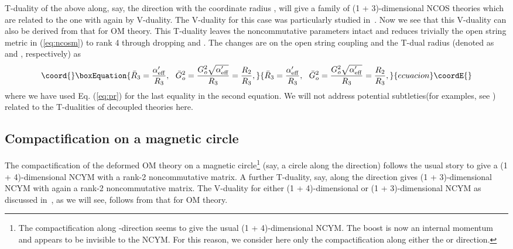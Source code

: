 \documentclass[a4paper,12pt]{article}
\begin{document}
	T-duality of the above along, say, the \coordHE{} direction with the 
coordinate radius \coordHE{}, will give a family of (1 + 3)-dimensional NCOS 
theories which are related to the one with \coordHE{} again by
V-duality. The V-duality for this  case was particularly studied
in~\cite{CW,CLW}.
Now we see that this V-duality can also be derived from that for OM
theory. This T-duality leaves the noncommutative parameters
intact and reduces trivially the open string metric in (\ref{eq:ncosm})
to rank 4 through dropping \coordHE{} and \coordHE{}. The changes
are on the open string coupling and the T-dual radius (denoted as \coordHE{}
and  \coordHE{}, respectively) as
\begin{equation}\coord{}\boxEquation{
\bar R_3 = \frac{\alpha'_{\rm eff}}{R_3}, \ \ \bar G^2_o = \frac{G^2_o 
\sqrt{\alpha'_{\rm eff}}}{R_3} = \frac{R_2}{R_3},
}{
\bar R_3 = \frac{\alpha'_{\rm eff}}{R_3}, \ \ \bar G^2_o = \frac{G^2_o 
\sqrt{\alpha'_{\rm eff}}}{R_3} = \frac{R_2}{R_3},
}{ecuacion}\coordE{}\end{equation}
where we have used Eq. (\ref{eq:pr}) for the last equality in the second
equation. We will not address potential subtleties(for examples, 
see \cite{klem,kawt,dangkone,dangktwo}) related to the
T-dualities of decoupled theories here. 

\subsection{Compactification on a magnetic circle}

	The compactification of the deformed OM theory on a magnetic
circle\footnote{The
compactification along \coordHE{}-direction seems to give the usual 
(1 + 4)-dimensional NCYM. The boost is now an internal momentum and
appears to be invisible to the NCYM. For this reason, we consider here
only the compactification along either the \coordHE{} or \coordHE{} direction.} 
(say, a circle along the \coordHE{} direction) follows the usual story 
to give a (1 + 4)-dimensional NCYM with a rank-2 noncommutative matrix.
A further T-duality, say, along the \coordHE{} direction gives (1 +
3)-dimensional NCYM with again a rank-2 noncommutative matrix. The
V-duality for either (1 + 4)-dimensional or (1 + 3)-dimensional NCYM as 
discussed in~\cite{CLW}, as we will see, follows from that for OM theory.
\end{document}
